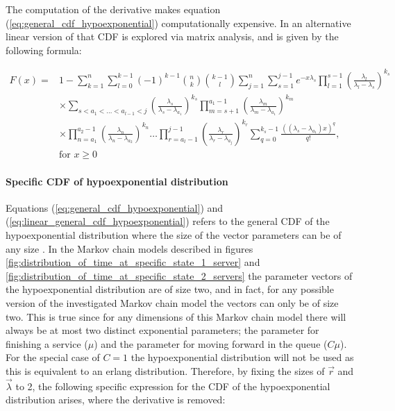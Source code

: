The computation of the derivative makes equation 
(\ref{eq:general_cdf_hypoexponential}) computationally expensive. 
In \cite{Legros2015} an alternative linear version of that CDF is explored via 
matrix analysis, and is given by the following formula:

\begin{equation} \label{eq:linear_general_cdf_hypoexponential}
    \begin{split}
        F(x) = &1 - \sum_{k=1}^{n} \sum_{l=0}^{k-1} (-1)^{k-1} \binom{n}{k} 
            \binom{k-1}{l} \sum_{j=1}^{n} \sum_{s=1}^{j-1} e^{-x \lambda_s} 
            \prod_{l=1}^{s-1} \left( \frac{\lambda_l}{\lambda_l - \lambda_s} \right)
            ^ {k_s} \\
        & \times \sum_{s < a_1 < \dots < a_{l-1} < j} 
            \left( \frac{\lambda_s}{\lambda_s - \lambda_{a_1}} \right) ^ {k_s}
            \prod_{m=s+1}^{a_1-1} \left( \frac{\lambda_m}{\lambda_m - 
            \lambda_{a_1}}\right) ^ {k_m} \\  
        & \times \prod_{n=a_1}^{a_2-1} \left( \frac{\lambda_n}{\lambda_n - 
            \lambda_{a_2}}\right) ^ {k_n} \dots 
            \prod_{r=a_l-1}^{j-1} \left( \frac{\lambda_r}{\lambda_r - 
            \lambda_{a_j}}\right) ^ {k_r}  
            \sum_{q=0}^{k_s - 1} \frac{((\lambda_s - \lambda_{a_1})x)^q}{q!}, \\
        & \text{for } x \geq 0
    \end{split}
\end{equation}


\paragraph{Specific CDF of hypoexponential distribution}
Equations (\ref{eq:general_cdf_hypoexponential}) and 
(\ref{eq:linear_general_cdf_hypoexponential}) refers to the general CDF of the
hypoexponential distribution where the size of the vector parameters can be of
any size \cite{Favaro2010}.
In the Markov chain models described in figures 
\ref{fig:distribution_of_time_at_specific_state_1_server} and 
\ref{fig:distribution_of_time_at_specific_state_2_servers} the parameter vectors 
of the hypoexponential distribution are of size two, and in fact, for any 
possible version of the investigated Markov chain model the vectors can only be 
of size two.
This is true since for any dimensions of this Markov chain model there will 
always be at most two distinct exponential parameters; the parameter for 
finishing a service (\(\mu\)) and the parameter for moving forward in the queue 
(\(C \mu\)). 
For the special case of \(C=1\) the hypoexponential distribution will not be 
used as this is equivalent to an erlang distribution.
Therefore, by fixing the sizes of \(\vec{r}\) and \(\vec{\lambda}\) to 2, the 
following specific expression for the CDF of the hypoexponential distribution
arises, where the derivative is removed:


